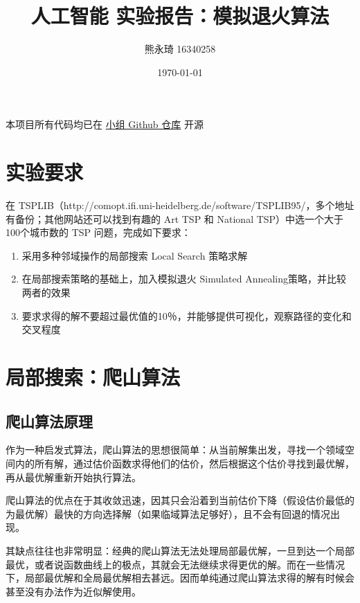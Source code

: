 \documentclass[12pt]{article}%
\begin{document}
\title{人工智能 实验报告：模拟退火算法}
\author{熊永琦 16340258}
\date{\today}
\maketitle

\begin{center}
本项目所有代码均已在 \href{https://github.com/xwy27/ArtificialIntelligenceProjects}{小组 Github 仓库} 开源
\end{center}

\section{实验要求}

在 TSPLIB（http://comopt.ifi.uni-heidelberg.de/software/TSPLIB95/，多个地址有备份；其他网站还可以找到有趣的 Art TSP 和 National TSP）中选一个大于100个城市数的 TSP 问题，完成如下要求：

\begin{enumerate}
\item 采用多种邻域操作的局部搜索 Local Search 策略求解
\item 在局部搜索策略的基础上，加入模拟退火 Simulated Annealing策略，并比较两者的效果
\item 要求求得的解不要超过最优值的10％，并能够提供可视化，观察路径的变化和交叉程度
\end{enumerate}

\section{局部搜索：爬山算法}

\subsection{爬山算法原理}

作为一种启发式算法，爬山算法的思想很简单：从当前解集出发，寻找一个领域空间内的所有解，通过估价函数求得他们的估价，然后根据这个估价寻找到最优解，再从最优解重新开始执行算法。

爬山算法的优点在于其收敛迅速，因其只会沿着到当前估价下降（假设估价最低的为最优解）最快的方向选择解（如果临域算法足够好），且不会有回退的情况出现。

其缺点往往也非常明显：经典的爬山算法无法处理局部最优解，一旦到达一个局部最优，或者说函数曲线上的极点，其就会无法继续求得更优的解。而在一些情况下，局部最优解和全局最优解相去甚远。因而单纯通过爬山算法求得的解有时候会甚至没有办法作为近似解使用。
\end{document}
